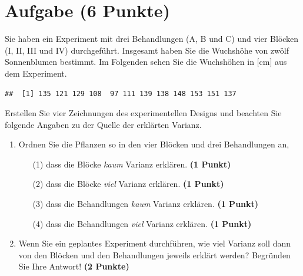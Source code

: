 \documentclass[a4paper, 10pt]{scrartcl}\usepackage[]{graphicx}\usepackage[]{xcolor}
\makeatletter
\newenvironment{kframe}{%
 \def\at@end@of@kframe{}%
 \ifinner\ifhmode%
  \def\at@end@of@kframe{\end{minipage}}%
  \begin{minipage}{\columnwidth}%
 \fi\fi%
 \def\FrameCommand##1{\hskip\@totalleftmargin \hskip-\fboxsep
 \colorbox{shadecolor}{##1}\hskip-\fboxsep
     \hskip-\linewidth \hskip-\@totalleftmargin \hskip\columnwidth}%
 \MakeFramed {\advance\hsize-\width
   \@totalleftmargin\z@ \linewidth\hsize
   \@setminipage}}%
 {\par\unskip\endMakeFramed%
 \at@end@of@kframe}
\newenvironment{knitrout}{}{} %
\makeatother
\begin{document}
\clearpage

\section{Aufgabe \hfill (6 Punkte)}

Sie haben ein Experiment mit drei Behandlungen (A, B und C) und vier
Bl{\"o}cken (I, II, III und IV) durchgef{\"u}hrt. Insgesamt haben Sie die Wuchsh{\"o}he
von zw{\"o}lf Sonnenblumen bestimmt. Im Folgenden sehen Sie die Wuchsh{\"o}hen in
[cm] aus dem Experiment.


\begin{knitrout}
\color{fgcolor}\begin{kframe}
\begin{verbatim}
##  [1] 135 121 129 108  97 111 139 138 148 153 151 137
\end{verbatim}
\end{kframe}
\end{knitrout}

Erstellen Sie vier Zeichnungen des experimentellen Designs und beachten
Sie folgende Angaben zu der Quelle der erkl{\"a}rten Varianz. 

\begin{enumerate}
\item Ordnen Sie die Pflanzen so in den vier Bl{\"o}cken und drei Behandlungen an,
  \begin{enumerate}
  \item[(1)] dass die Bl{\"o}cke \textit{kaum} Varianz erkl{\"a}ren. \textbf{(1 Punkt)}
  \item[(2)] dass die Bl{\"o}cke \textit{viel} Varianz erkl{\"a}ren. \textbf{(1 Punkt)}  
  \item[(3)] dass die Behandlungen \textit{kaum} Varianz erkl{\"a}ren. \textbf{(1 Punkt)}
  \item[(4)] dass die Behandlungen \textit{viel} Varianz erkl{\"a}ren. \textbf{(1 Punkt)}
  \end{enumerate}
\item Wenn Sie ein geplantes Experiment durchf{\"u}hren, wie viel Varianz soll dann von
  den Bl{\"o}cken und den Behandlungen jeweils erkl{\"a}rt werden? Begr{\"u}nden Sie
  Ihre Antwort! \textbf{(2 Punkte)}
\end{enumerate}
 
\clearpage
\end{document}
